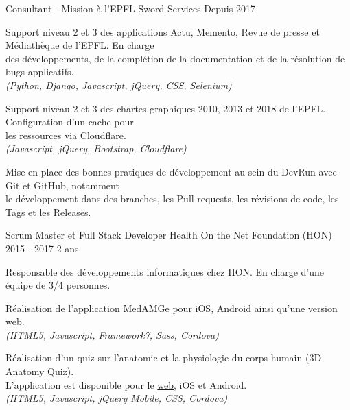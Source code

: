 
\begin{cventries}

  \cventry
    {Consultant - Mission à l'EPFL}
    {Sword Services}
    {Depuis 2017}
    {}
    {
      \begin{cvitems}
        \item{Support niveau 2 et 3 des applications Actu, Memento, Revue de
        presse et Médiathèque de l'EPFL. En charge \\des développements, de la
        complétion de la documentation et de la résolution de bugs
        applicatifs.\\
        \textit{(Python, Django, Javascript, jQuery, CSS, Selenium)}
        }
        \item{Support niveau 2 et 3 des chartes graphiques 2010, 2013 et 2018
        de l'EPFL. Configuration d'un cache pour \\les ressources via
        Cloudflare.\\
        \textit{(Javascript, jQuery, Bootstrap, Cloudflare)}
        }
        \item{Mise en place des bonnes pratiques de développement au sein du
        DevRun avec Git et GitHub, notamment \\le développement dans des
        branches, les Pull requests, les révisions de code, les Tags et les
        Releases.
        }
      \end{cvitems}
    }

  \cventry
    {Scrum Master et Full Stack Developer}
    {Health On the Net Foundation (HON)}
    {2015 - 2017}
    {2 ans}
    {
      \begin{cvitems}
        \item{Responsable des développements informatiques chez HON. En charge
        d'une équipe de 3/4 personnes.
        }
        \item{Réalisation de l'application MedAMGe pour
          {\color{awesome-skyblue}
            \href{https://itunes.apple.com/us/app/medamge/id469762154?mt=8}{iOS}},
          {\color{awesome-skyblue}
            \href{https://play.google.com/store/apps/details?id=org.healthonnet.medamge.android&hl=en}{Android}}
          ainsi qu'une version
          {\color{awesome-skyblue}
            \href{https://www.medamge.ch}{web}}.\\
          \textit{(HTML5, Javascript, Framework7, Sass, Cordova)}
        }
        \item{Réalisation d'un quiz sur l'anatomie et la physiologie du corps
          humain (3D Anatomy Quiz). \\L'application est disponible pour le
          {\color{awesome-skyblue}
            \href{https://www.santeromande.ch/Game/}{web}}, iOS et Android.\\
          \textit{(HTML5, Javascript, jQuery Mobile, CSS, Cordova)}
        }
      \end{cvitems}
    }


\end{cventries}
